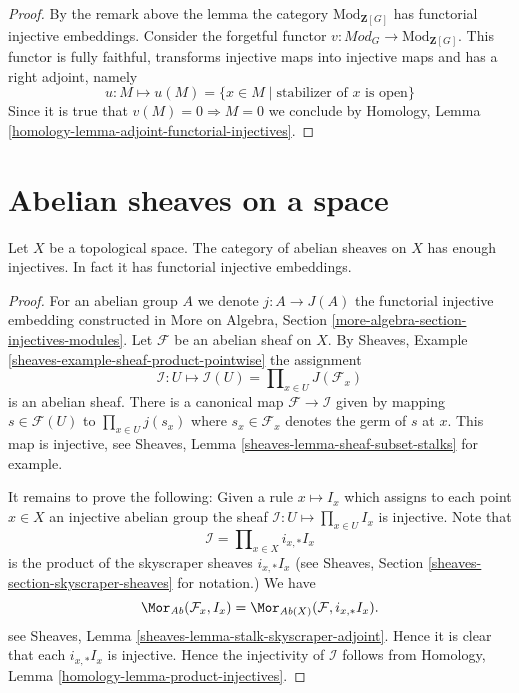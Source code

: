 \begin{proof}
By the remark above the lemma the category $\text{Mod}_{\mathbf{Z}[G]}$
has functorial injective embeddings.
Consider the forgetful functor
$v : \textit{Mod}_G \to \text{Mod}_{\mathbf{Z}[G]}$.
This functor is fully faithful, transforms injective maps into
injective maps and has a right adjoint, namely
$$
u : M \mapsto u(M) = \{x \in M \mid \text{stabilizer of }x\text{ is open}\}
$$
Since it is true that $v(M) = 0 \Rightarrow M = 0$ we conclude by
Homology, Lemma \ref{homology-lemma-adjoint-functorial-injectives}.
\end{proof}



\section{Abelian sheaves on a space}
\label{section-abelian-sheaves-space}


\begin{lemma}
\label{lemma-abelian-sheaves-space}
Let $X$ be a topological space.
The category of abelian sheaves on $X$ has enough injectives.
In fact it has functorial injective embeddings.
\end{lemma}

\begin{proof}
For an abelian group $A$ we denote $j : A \to J(A)$ the functorial
injective embedding constructed in
More on Algebra, Section \ref{more-algebra-section-injectives-modules}.
Let $\mathcal{F}$ be an abelian sheaf on $X$.
By Sheaves, Example \ref{sheaves-example-sheaf-product-pointwise}
the assignment
$$
\mathcal{I} : U \mapsto
\mathcal{I}(U) = \prod\nolimits_{x\in U} J(\mathcal{F}_x)
$$
is an abelian sheaf. There is a canonical map $\mathcal{F} \to \mathcal{I}$
given by mapping $s \in \mathcal{F}(U)$ to $\prod_{x \in U} j(s_x)$
where $s_x \in \mathcal{F}_x$ denotes the germ of $s$ at $x$.
This map is injective, see
Sheaves, Lemma \ref{sheaves-lemma-sheaf-subset-stalks}
for example.

\medskip\noindent
It remains to prove the following: Given a rule
$x \mapsto I_x$ which assigns to each point $x \in X$ an injective
abelian group the sheaf $\mathcal{I} : U \mapsto \prod_{x \in U} I_x$
is injective. Note that
$$
\mathcal{I} = \prod\nolimits_{x \in X} i_{x, *}I_x
$$
is the product of the skyscraper sheaves $i_{x, *}I_x$ (see
Sheaves, Section \ref{sheaves-section-skyscraper-sheaves} for notation.)
We have
$$
\Mor_{\textit{Ab}}(\mathcal{F}_x, I_x)
=
\Mor_{\textit{Ab}(X)}(\mathcal{F}, i_{x, *}I_x).
$$
see Sheaves, Lemma \ref{sheaves-lemma-stalk-skyscraper-adjoint}. Hence it is
clear that each $i_{x, *}I_x$ is injective. Hence the injectivity of
$\mathcal{I}$ follows from
Homology, Lemma \ref{homology-lemma-product-injectives}.
\end{proof}









